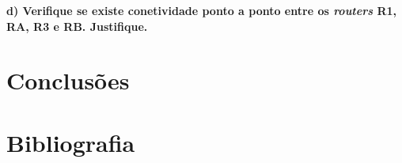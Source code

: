\documentclass[11pt,english, openright, oneside]{book}
\newcommand\blankpage{%
    \null
    \thispagestyle{empty}%
    \newpage}
\begin{document}
\vspace{0.8cm}

\textbf{d) Verifique se existe conetividade ponto a ponto entre os \textit{routers} R1, RA, R3 e RB. Justifique.}
\vspace{0.2cm}

\vspace{0.8cm}


\chapter{Conclusões}



\chapter{Bibliografia}



\mainmatter



\afterpage{\blankpage}
\end{document}
